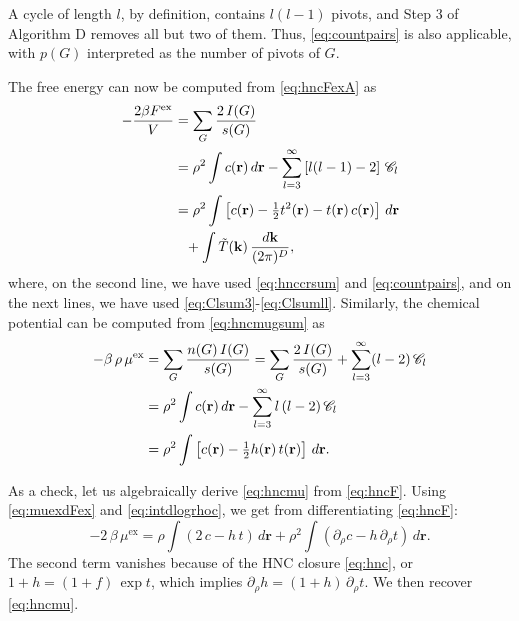 \documentclass[aip,jcp,reprint,superscriptaddress]{revtex4-1}
\newcommand{\vct}[1]{\mathbf{#1}}
\providecommand{\vr}{} %
\renewcommand{\vr}{\vct{r}}
\newcommand{\vk}{\vct{k}}
\newcommand{\dvk}{\frac{d\vk}{(2\pi)^D}}
\newcommand{\supex}[1]{ { { #1 }^{ \mathrm{ex} } } }
\newcommand{\Fex}{\supex{F}}
\newcommand{\muex}{\supex{\mu}}
\newcommand{\Chn}{\mathscr{C}}
\newcommand{\A}{\mathcal{A}}
\begin{document}
A cycle of length $l$, by definition,
  contains $l (l - 1)$ pivots,
  and Step 3 of Algorithm D
  removes all but two of them.
%
Thus, \eqref{eq:countpairs}
  is also applicable, with $p(G)$ interpreted
  as the number of pivots of $G$.



The free energy can now be computed from \eqref{eq:hncFexA}
as\cite{morita1958, *morita1959, *morita1960, singer1985}
%
\begin{align}
    - \frac{ 2 \beta \Fex } { V }
  &=
      \sum_G \frac{ 2 \, I(G) } { s(G) }
      \notag \\
  &=
      \rho^2 \int c(\vr) \, d\vr
    - \sum_{l = 3}^\infty \left[ l(l-1) - 2 \right] \, \Chn_l
      \notag \\
  &=
      \rho^2 \int \left[ c(\vr) - \tfrac{1}{2} t^2(\vr) - t(\vr) \, c(\vr) \right] \, d\vr
      \notag \\
  & \hphantom{=}
      + \int  \tilde{T}(\vk) \, \dvk,
\label{eq:hncF}
\end{align}
%
where,
  on the second line,
  we have used \eqref{eq:hnccrsum} and \eqref{eq:countpairs},
  and on the next lines,
  we have used \eqref{eq:Clsum3}-\eqref{eq:Clsumll}.
%
Similarly, the chemical potential
  can be computed from \eqref{eq:hncmugsum}
  as \cite{morita1958, *morita1959, *morita1960, singer1985}
%
\begin{align}
    - \beta \, \rho \, \muex
  &=
      \sum_G \frac{ n(G) \, I(G) } { s(G) }
  =
      \sum_G \frac{ 2 \, I(G) } { s(G) }
    + \sum_{l = 3}^\infty (l-2) \, \Chn_l
      \notag \\
  &=
      \rho^2 \int c(\vr) \, d\vr
    - \sum_{l = 3}^\infty l \, (l-2) \, \Chn_l
      \notag \\
  &=
      \rho^2 \int \left[ c(\vr) - \tfrac{1}{2} h(\vr) \, t(\vr) \right] \, d\vr.
\label{eq:hncmu}
\end{align}
%


As a check, let us algebraically derive \eqref{eq:hncmu} from \eqref{eq:hncF}.
%
Using \eqref{eq:muexdFex} and \eqref{eq:intdlogrhoc},
we get from differentiating \eqref{eq:hncF}:
\[
  -2 \, \beta \, \muex = \rho \int (2\,c - h \, t) \, d\vr
  + \rho^2 \int (\partial_\rho c - h \, \partial_\rho t) \, d\vr.
\]
The second term vanishes because of the HNC closure \eqref{eq:hnc},
or
$1+h = (1+f) \, \exp t$,
%
  which implies $\partial_\rho h = (1+ h) \, \partial_\rho t$.
%
We then recover \eqref{eq:hncmu}.
\end{document}
